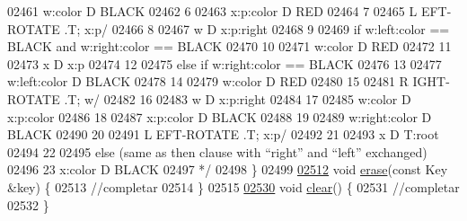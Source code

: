 \begin{DoxyCode}
02461 \textcolor{comment}{        w:color D BLACK}
02462 \textcolor{comment}{        6}
02463 \textcolor{comment}{        x:p:color D RED}
02464 \textcolor{comment}{        7}
02465 \textcolor{comment}{        L EFT-ROTATE .T; x:p/}
02466 \textcolor{comment}{        8}
02467 \textcolor{comment}{        w D x:p:right}
02468 \textcolor{comment}{        9}
02469 \textcolor{comment}{        if w:left:color == BLACK and w:right:color == BLACK}
02470 \textcolor{comment}{        10}
02471 \textcolor{comment}{        w:color D RED}
02472 \textcolor{comment}{        11}
02473 \textcolor{comment}{        x D x:p}
02474 \textcolor{comment}{        12}
02475 \textcolor{comment}{        else if w:right:color == BLACK}
02476 \textcolor{comment}{        13}
02477 \textcolor{comment}{        w:left:color D BLACK}
02478 \textcolor{comment}{        14}
02479 \textcolor{comment}{        w:color D RED}
02480 \textcolor{comment}{        15}
02481 \textcolor{comment}{        R IGHT-ROTATE .T; w/}
02482 \textcolor{comment}{        16}
02483 \textcolor{comment}{        w D x:p:right}
02484 \textcolor{comment}{        17}
02485 \textcolor{comment}{        w:color D x:p:color}
02486 \textcolor{comment}{        18}
02487 \textcolor{comment}{        x:p:color D BLACK}
02488 \textcolor{comment}{        19}
02489 \textcolor{comment}{        w:right:color D BLACK}
02490 \textcolor{comment}{        20}
02491 \textcolor{comment}{        L EFT-ROTATE .T; x:p/}
02492 \textcolor{comment}{        21}
02493 \textcolor{comment}{        x D T:root}
02494 \textcolor{comment}{        22}
02495 \textcolor{comment}{        else (same as then clause with “right” and “left” exchanged)}
02496 \textcolor{comment}{        23 x:color D BLACK}
02497 \textcolor{comment}{*/}
02498             \}
02499 
\hypertarget{map2_8h_source_l02512}{}\hyperlink{classaed2_1_1iterator_a0a0e62b2a2c0fb98f431164c66a6e388_a0a0e62b2a2c0fb98f431164c66a6e388}{02512}                 \textcolor{keywordtype}{void} \hyperlink{classaed2_1_1iterator_a0a0e62b2a2c0fb98f431164c66a6e388_a0a0e62b2a2c0fb98f431164c66a6e388}{erase}(\textcolor{keyword}{const} Key &key) \{
02513                     \textcolor{comment}{//completar}
02514                 \}
02515 
\hypertarget{map2_8h_source_l02530}{}\hyperlink{classaed2_1_1iterator_ac98b533e402839c99d33d3118906c38f_ac98b533e402839c99d33d3118906c38f}{02530}                 \textcolor{keywordtype}{void} \hyperlink{classaed2_1_1iterator_ac98b533e402839c99d33d3118906c38f_ac98b533e402839c99d33d3118906c38f}{clear}() \{
02531                     \textcolor{comment}{//completar}
02532                 \}

\end{DoxyCode}
